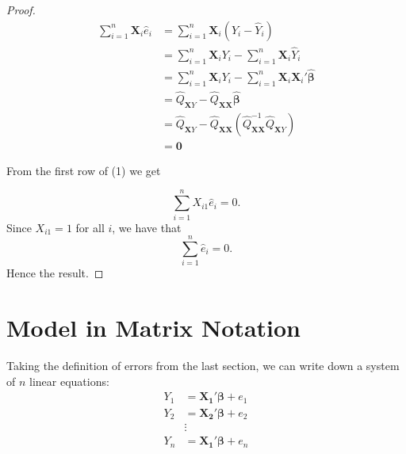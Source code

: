 \documentclass[
]{book}
\theoremstyle{definition}
\theoremstyle{definition}
\theoremstyle{definition}
\theoremstyle{definition}
\theoremstyle{remark}
\begin{document}
\begin{proof}
\begin{align}
\sum\limits_{i=1}^n\pmb{X}_i\widehat{e}_i 
&=\sum\limits_{i=1}^n\pmb{X}_i(Y_i-\widehat{Y}_i) \\
&=\sum\limits_{i=1}^n\pmb{X}_iY_i-\sum\limits_{i=1}^n\pmb{X}_i\widehat{Y}_i \\
&=\sum\limits_{i=1}^n\pmb{X}_iY_i-\sum\limits_{i=1}^n\pmb{X}_i\pmb{X}_i'\pmb{\widehat{\beta}} \\
&=\widehat{Q}_{\pmb{X}Y}-\widehat{Q}_{\pmb{XX}}\pmb{\widehat{\beta}} \\
&=\widehat{Q}_{\pmb{X}Y}-\widehat{Q}_{\pmb{XX}}
\left( \widehat{Q}_{\pmb{XX}}^{-1} \widehat{Q}_{\pmb{X}Y} \right) \\
&=\pmb{0}
\end{align}

From the first row of (1) we get

\[
\sum\limits_{i=1}^n X_{i1}\widehat{e}_i=0.
\]
Since \(X_{i1}=1\) for all \(i\), we have that
\[
\sum\limits_{i=1}^n\widehat{e}_i=0.
\]
Hence the result.
\end{proof}

\hypertarget{model-in-matrix-notation}{%
\section{Model in Matrix Notation}\label{model-in-matrix-notation}}

Taking the definition of errors from the last section, we can write down a system of \(n\) linear equations:
\begin{align}
Y_1 &= \pmb{X_1}'\pmb{\beta} + e_1 \\
Y_2 &= \pmb{X_2}'\pmb{\beta} + e_2 \\
& \vdots \\
Y_n &= \pmb{X_1}'\pmb{\beta} + e_n
\end{align}
\end{document}
